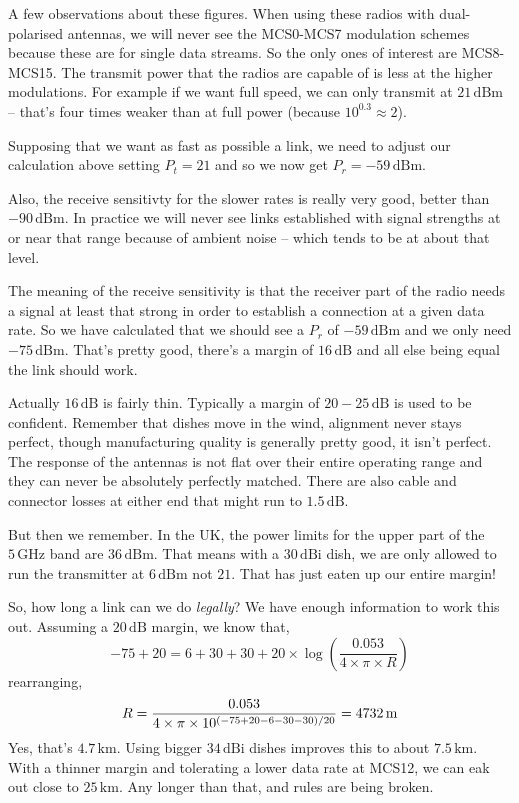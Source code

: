 A few observations about these figures. When using these radios with
dual-polarised antennas, we will never see the MCS0-MCS7 modulation
schemes because these are for single data streams. So the only ones of
interest are MCS8-MCS15. The transmit power that the radios are
capable of is less at the higher modulations. For example if we want
full speed, we can only transmit at $21\, \mathrm{dBm}$ -- that's four
times weaker than at full power (because $10^{0.3} \approx 2$). 

Supposing that we want as fast as possible a link, we need to adjust
our calculation above setting $P_t = 21$ and so we now get
$P_r = -59\, \mathrm{dBm}$.

Also, the receive sensitivty for the slower rates is really very good,
better than $-90\, \mathrm{dBm}$. In practice we will never see links
established with signal strengths at or near that range because of
ambient noise -- which tends to be at about that level.

The meaning of the receive sensitivity is that the receiver part of
the radio needs a signal at least that strong in order to establish a
connection at a given data rate. So we have calculated that we should
see a $P_r$ of $-59\, \mathrm{dBm}$ and we only need $-75\, \mathrm{dBm}$.
That's pretty good, there's a margin of $16\, \mathrm{dB}$ and all
else being equal the link should work.

Actually $16\, \mathrm{dB}$ is fairly thin. Typically a margin of
$20-25\, \mathrm{dB}$ is used to be confident. Remember that dishes
move in the wind, alignment never stays perfect, though manufacturing
quality is generally pretty good, it isn't perfect. The response of
the antennas is not flat over their entire operating range and they
can never be absolutely perfectly matched. There are also cable and
connector losses at either end that might run to $1.5\, \mathrm{dB}$.

But then we remember. In the UK, the power limits for the upper part
of the $5\,\mathrm{GHz}$ band are $36\, \mathrm{dBm}$. That means with
a $30\, \mathrm{dBi}$ dish, we are only allowed to run the transmitter
at $6\, \mathrm{dBm}$ not $21$. That has just eaten up our entire
margin!

So, how long a link can we do \textit{legally}? We have enough
information to work this out. Assuming a $20\, \mathrm{dB}$ margin, we
know that,
$$
-75 + 20 = 6 + 30 + 30 + 20 \times
\log \left(\frac{0.053}{4 \times \pi \times R} \right)
$$
rearranging,
$$
R = \frac{%
  0.053
}{%
  4 \times \pi \times 10^{\left(-75 + 20 - 6 - 30 - 30\right)/20}%
} = 4732\, \mathrm{m}
$$
Yes, that's $4.7\, \mathrm{km}$. Using bigger $34\, \mathrm{dBi}$
dishes improves this to about $7.5\, \mathrm{km}$. With a thinner
margin and tolerating a lower data rate at MCS12, we can eak out close
to $25\, \mathrm{km}$. Any longer than that, and rules are being
broken.


